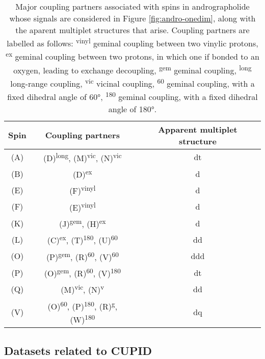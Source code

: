\begin{table}[h!]
\centering
\begin{tabular}{c c c}
\hline
Spin  & Coupling partners & Apparent multiplet structure \\
\hline
(A) & (D)\textsuperscript{long}, (M)\textsuperscript{vic}, (N)\textsuperscript{vic} & dt \\
(B) & (D)\textsuperscript{ex} & d \\
(E) & (F)\textsuperscript{vinyl}\note{, ...} & d\note{...} \\
(F) & (E)\textsuperscript{vinyl}\note{, ...} & d\note{...} \\
(K) & (J)\textsuperscript{gem}, (H)\textsuperscript{ex} & d \\
(L) & (C)\textsuperscript{ex}, (T)\textsuperscript{180}, (U)\textsuperscript{60} & dd \\
(O) & (P)\textsuperscript{gem}, (R)\textsuperscript{60}, (V)\textsuperscript{60} & ddd \\
(P) & (O)\textsuperscript{gem}, (R)\textsuperscript{60}, (V)\textsuperscript{180} & dt \\
(Q) & (M)\textsuperscript{vic}, (N)\textsuperscript{v} & dd \\
(V) & (O)\textsuperscript{60}, (P)\textsuperscript{180}, (R)\textsuperscript{g}, (W)\textsuperscript{180} & dq \\
\hline
\end{tabular}
\caption[
    Major coupling partners associated with spins in andrographolide whose
    signals are considered in Figure \ref{fig:andro-onedim}.
]{
    Major coupling partners associated with spins in andrographolide whose
    signals are considered in Figure \ref{fig:andro-onedim}, along with the
    aparent multiplet structures that arise.
    Coupling partners are labelled as follows:
    \textsuperscript{vinyl} geminal coupling between two vinylic protons,
    \textsuperscript{ex} geminal coupling between two protons, in which one
    if bonded to an oxygen, leading to exchange decoupling,
    \textsuperscript{gem} geminal coupling,
    \textsuperscript{long} long-range coupling,
    \textsuperscript{vic} vicinal coupling,
    \textsuperscript{60} geminal coupling, with a fixed dihedral angle of \ang{60},
    \textsuperscript{180} geminal coupling, with a fixed dihedral angle of \ang{180}.
}
\label{tab:andro-multiplets}
\end{table}


\subsection{Datasets related to \ac{CUPID}}

